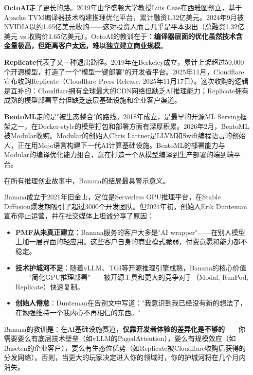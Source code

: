 \textbf{OctoAI}走了更长的路。2019年由华盛顿大学教授Luis Ceze在西雅图创立，基于Apache TVM编译器技术构建推理优化平台，累计融资1.32亿美元。2024年9月被NVIDIA以约1.65亿美元收购——这对投资人而言几乎是平本退出（总融资1.32亿美元 vs.收购价1.65亿美元）。OctoAI的教训在于：\textbf{编译器层面的优化虽然技术含金量极高，但距离客户太远，难以独立建立商业规模}。

\textbf{Replicate}代表了又一种退出路径。2019年在Berkeley成立，累计上架超过50,000个开源模型，打造了一个"模型一键部署"的开发者平台。2025年11月，Cloudflare宣布收购Replicate（Cloudflare Press Release, 2025年11月17日）。这次收购的逻辑是互补的：Cloudflare拥有全球最大的CDN网络但缺乏AI推理能力；Replicate拥有成熟的模型部署平台但缺乏底层基础设施和企业客户渠道。

\textbf{BentoML}走的是"被生态整合"的路线。2018年成立，是最早的开源ML Serving框架之一，在Docker-style的模型打包和部署方面有深厚积累。2026年2月，BentoML被Modular收购。Modular的创始人Chris Lattner是LLVM和Swift编程语言的创始人，正在用Mojo语言构建下一代AI计算基础设施。BentoML的部署能力与Modular的编译优化能力组合，意在打造一个从模型编译到生产部署的端到端平台。

\begin{warnbox}
在所有推理创业故事中，Banana的结局最具警示意义。

Banana成立于2021年旧金山，定位是Serverless GPU推理平台，在Stable Diffusion爆发期吸引了超过3000个开发团队。但2024年初，创始人Erik Dunteman宣布停止运营，并在社交媒体上坦诚分享了原因：

\begin{itemize}[noitemsep]
  \item \textbf{PMF从未真正建立}：Banana服务的客户大多是"AI wrapper"——在别人模型上加一层界面的轻应用。这些客户自身的商业模式脆弱，付费意愿和能力都不稳定。
  \item \textbf{技术护城河不足}：随着vLLM、TGI等开源推理引擎成熟，Banana的核心价值——"简化GPU推理部署"——被开源工具和更大的竞争对手（Modal, RunPod, Replicate）快速复制。
  \item \textbf{创始人倦怠}：Dunteman在告别文中写道："我意识到我已经没有新的想法了，在勉强维持一个我内心不再相信的东西。"
\end{itemize}

Banana的教训是：在AI基础设施赛道，\textbf{仅靠开发者体验的差异化是不够的}——你需要要么有底层技术壁垒（如vLLM的PagedAttention），要么有规模效应（如Baseten的企业客户），要么有生态位优势（如Replicate被Cloudflare收购后获得的分发网络）。否则，当更大的玩家决定进入你的领域时，你的护城河将在几个月内消失。
\end{warnbox}

